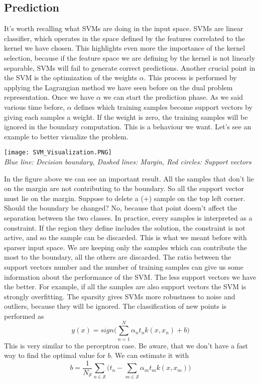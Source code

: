 \documentclass[main.tex]{subfiles}
\begin{document}
\subsection{Prediction} It's worth recalling what SVMs are doing in the input space. SVMs are linear classifier, which operates in the space defined by the features correlated to the kernel we have chosen. This highlights even more the importance of the kernel selection, because if the feature space we are defining by the kernel is not linearly separable, SVMs will fail to generate correct predictions. Another crucial point in the SVM is the optimization of the weights $\alpha$. This process is performed by applying the Lagrangian method we have seen before on the dual problem representation. Once we have $\alpha$ we can start the prediction phase.
As we said various time before, $\alpha$ defines which training samples become support vectors by giving each samples a weight. If the weight is zero, the training samples will be ignored in the boundary computation. This is a behaviour we want. Let's see an example to better visualize the problem.
\begin{center}
    \texttt{[image: SVM\_Visualization.PNG]} \\
    \textit{Blue line: Decision boundary, Dashed lines: Margin, Red circles: Support vectors}
\end{center}
In the figure above we can see an important result. All the samples that don't lie on the margin are not contributing to the boundary. So all the support vector must lie on the margin. Suppose to delete a (+) sample on the top left corner. Should the boundary be changed? No, because that point doesn't affect the separation between the two classes. In practice, every samples is interpreted as a constraint. If the region they define includes the solution, the constraint is not active, and so the sample can be discarded. This is what we meant before with sparser input space. We are keeping only the samples which can contribute the most to the boundary, all the others are discarded. The ratio between the support vectors number and the number of training samples can give us some information about the performance of the SVM. The less support vectors we have the better. For example, if all the samples are also support vectors the SVM is strongly overfitting. The sparsity gives SVMs more robustness to noise and outliers, because they will be ignored.
\newline
The classification of new points is performed as
\begin{equation}
    y(x) = sign \bigg( \sum_{n=1}^N \alpha_n t_n k(x, x_n) +b \bigg)
\end{equation}
This is very similar to the perceptron case. Be aware, that we don't have a fast way to find the optimal value for $b$. We can estimate it with
\begin{equation*}
    b = \frac{1}{N_\mathcal{S}} \sum_{n \in \mathcal{S}} \bigg( t_n - \sum_{m \in \mathcal{S}} \alpha_m t_m k(x,x_m) \bigg)
\end{equation*}
\end{document}
